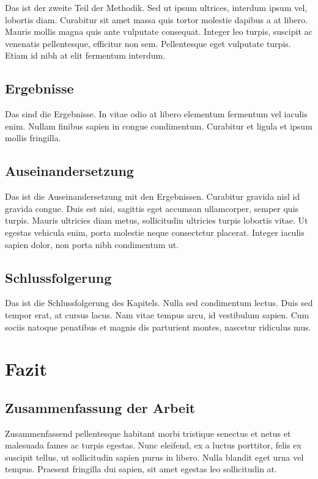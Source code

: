 \documentclass[listof=totoc,index=totoc,bibliography=totoc,12pt,ngerman,a4paper,]{report}
\begin{document}
Das ist der zweite Teil der Methodik. Sed ut ipsum ultrices, interdum
ipsum vel, lobortis diam. Curabitur sit amet massa quis tortor molestie
dapibus a at libero. Mauris mollis magna quis ante vulputate consequat.
Integer leo turpis, suscipit ac venenatis pellentesque, efficitur non
sem. Pellentesque eget vulputate turpis. Etiam id nibh at elit fermentum
interdum.

\section{Ergebnisse}\label{ergebnisse-3}

Das sind die Ergebnisse. In vitae odio at libero elementum fermentum vel
iaculis enim. Nullam finibus sapien in congue condimentum. Curabitur et
ligula et ipsum mollis fringilla.

\section{Auseinandersetzung}\label{auseinandersetzung-3}

Das ist die Auseinandersetzung mit den Ergebnissen. Curabitur gravida
nisl id gravida congue. Duis est nisi, sagittis eget accumsan
ullamcorper, semper quis turpis. Mauris ultricies diam metus,
sollicitudin ultricies turpis lobortis vitae. Ut egestas vehicula enim,
porta molestie neque consectetur placerat. Integer iaculis sapien dolor,
non porta nibh condimentum ut.

\section{Schlussfolgerung}\label{schlussfolgerung-3}

Das ist die Schlussfolgerung des Kapitels. Nulla sed condimentum lectus.
Duis sed tempor erat, at cursus lacus. Nam vitae tempus arcu, id
vestibulum sapien. Cum sociis natoque penatibus et magnis dis parturient
montes, nascetur ridiculus mus.

\chapter{Fazit}\label{sec:conclusion}

\section{Zusammenfassung der Arbeit}\label{zusammenfassung-der-arbeit}

Zusammenfassend pellentesque habitant morbi tristique senectus et netus
et malesuada fames ac turpis egestas. Nunc eleifend, ex a luctus
porttitor, felis ex suscipit tellus, ut sollicitudin sapien purus in
libero. Nulla blandit eget urna vel tempus. Praesent fringilla dui
sapien, sit amet egestas leo sollicitudin at.
\end{document}
